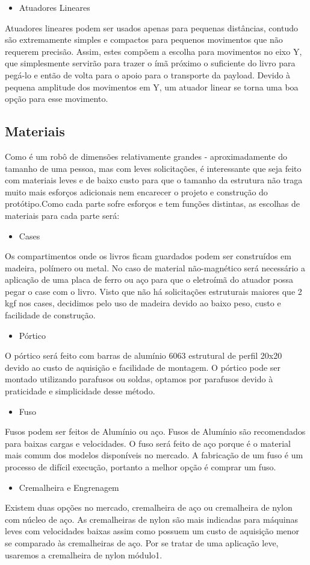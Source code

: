 \begin{itemize}
\item{Atuadores Lineares}
\end{itemize}
Atuadores lineares podem ser usados apenas para pequenas distâncias, contudo são extremamente simples e compactos para pequenos movimentos que não requerem precisão. Assim, estes compõem a escolha para movimentos no eixo Y, que simplesmente servirão para trazer o ímã próximo o suficiente do livro para pegá-lo e então de volta para o apoio para o transporte da payload. Devido à pequena amplitude dos movimentos em Y, um atuador linear se torna uma boa opção para esse movimento.

\subsection{Materiais}

Como é um robô de dimensões relativamente grandes - aproximadamente do tamanho de uma pessoa, mas com leves solicitações, é interessante que seja feito com materiais leves e de baixo custo para que o tamanho da estrutura não traga muito mais esforços adicionais nem encarecer o projeto e construção do protótipo.Como cada parte sofre esforços e tem funções distintas, as escolhas de materiais para cada parte será:
\begin{itemize}
\item{Cases}
\end{itemize}
Os compartimentos onde os livros ficam guardados podem ser construídos em madeira, polímero ou metal. No caso de material não-magnético será necessário a aplicação de uma placa de ferro ou aço para que o eletroímã do atuador possa pegar o case com o livro. Visto que não há solicitações estruturais maiores que 2 kgf nos cases, decidimos pelo uso de madeira devido ao baixo peso, custo e facilidade de construção.
\begin{itemize}
\item{Pórtico}
\end{itemize}
O pórtico será feito com barras de alumínio 6063 estrutural de perfil 20x20 devido ao custo de aquisição e facilidade de montagem. O pórtico pode ser montado utilizando parafusos ou soldas, optamos por parafusos devido à praticidade e simplicidade desse método.
\begin{itemize}
\item{Fuso}
\end{itemize}
Fusos podem ser feitos de Alumínio ou aço. Fusos de Alumínio são recomendados para  baixas cargas e velocidades. O fuso será feito de aço porque é o material mais comum dos modelos disponíveis no mercado. A fabricação de um fuso é um processo de difícil execução, portanto a melhor opção é comprar um fuso.
\begin{itemize}
\item{Cremalheira e Engrenagem}
\end{itemize}
Existem duas opções no mercado, cremalheira de aço ou cremalheira de nylon com núcleo de aço. As cremalheiras de nylon são mais indicadas para máquinas leves com velocidades baixas assim como possuem um custo de aquisição menor se comparado às cremalheiras de aço. Por se tratar de uma aplicação leve, usaremos a cremalheira de nylon módulo1.

